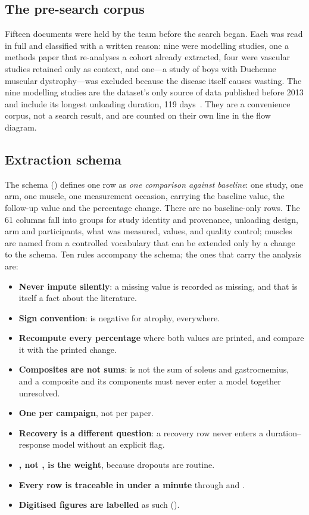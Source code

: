 \subsection{The pre-search corpus}
\label{sec:corpus}

Fifteen documents were held by the team before the search began. Each was read in full and classified with a
written reason: nine were modelling studies, one a methods paper that re-analyses a cohort already extracted, four
were vascular studies retained only as context, and one---a study of boys with Duchenne muscular dystrophy---was
excluded because the disease itself causes wasting. The nine modelling studies are the dataset's only source of
data published before 2013 and include its longest unloading duration, 119 days~\citep{leblanc1992}. They are a
convenience corpus, not a search result, and are counted on their own line in the flow diagram.

\subsection{Extraction schema}
\label{sec:schema}

The schema () defines one row as \emph{one comparison against baseline}: one study, one arm,
one muscle, one measurement occasion, carrying the baseline value, the follow-up value and the percentage change.
There are no baseline-only rows. The 61 columns fall into groups for study identity and provenance, unloading
design, arm and participants, what was measured, values, and quality control; muscles are named from a controlled
vocabulary that can be extended only by a change to the schema. Ten rules accompany the schema; the ones that
carry the analysis are:

\begin{itemize}
  \item \textbf{Never impute silently}: a missing value is recorded as missing, and that is itself a fact about
        the literature.
  \item \textbf{Sign convention}:  is negative for atrophy, everywhere.
  \item \textbf{Recompute every percentage} where both values are printed, and compare it with the printed change.
  \item \textbf{Composites are not sums}:  is not the sum of soleus and gastrocnemius, and a
        composite and its components must never enter a model together unresolved.
  \item \textbf{One  per campaign}, not per paper.
  \item \textbf{Recovery is a different question}: a recovery row never enters a duration--response model without
        an explicit flag.
  \item \textbf{, not , is the weight}, because dropouts are routine.
  \item \textbf{Every row is traceable in under a minute} through  and .
  \item \textbf{Digitised figures are labelled} as such ().
\end{itemize}

